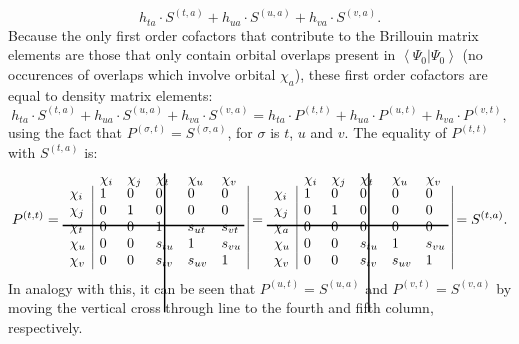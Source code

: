 \begin{equation}
h_{ta} \cdot S^{(t,a)} + h_{ua} \cdot S^{(u,a)} + h_{va} \cdot S^{(v,a)}.
\label{ch2.eq.ta_1el2}
\end{equation}
Because the only first order cofactors that contribute to the Brillouin matrix elements are those that only contain orbital overlaps present in $\left< \Psi_0 | \Psi_0 \right>$ (no occurences of overlaps which involve orbital $\chi_a$), these first order cofactors are equal to density matrix elements:
\begin{equation}
h_{ta} \cdot S^{(t,a)} + h_{ua} \cdot S^{(u,a)} + h_{va} \cdot S^{(v,a)} = h_{ta} \cdot P^{(t,t)} + h_{ua} \cdot P^{(u,t)} + h_{va} \cdot P^{(v,t)},
\label{ch2.eq.ta_i1}
\end{equation}
using the fact that $P^{(\sigma,t)} = S^{(\sigma,a)}$, for $\sigma$ is $t$, $u$ and $v$. The equality of $P^{(t,t)}$ with $S ^{(t,a)}$ is:
\begin{equation}
P^{(t,t)}=
\begin{array}{llllll}
 & \hskip 46.0 pt \hbox{\lower 93pt\hbox{\vrule height100pt width 1.0pt}}\hskip-47.0pt \chi_i & \chi_j & \chi_t & \chi_u & \chi_v \\
 \noalign{\vskip-91pt}
 \chi_i &  \multicolumn{1}{|l}{ 1 } & 0 & 0 & 0 & \multicolumn{1}{l|}{ 0 } \\
 \chi_j & \multicolumn{1}{|l}{ 0 } & 1 & 0 & 0 & \multicolumn{1}{l|}{ 0 } \\
 \chi_t & \multicolumn{1}{|l}{ 0 } & 0 & 1 & s_{ut} & \multicolumn{1}{l|}{s_{vt}} \\
 \noalign{\vskip-8pt}
 \multispan6\hbox{\vrule  height 1.0 pt width130pt}\cr
 \noalign{\vskip 7pt}
 \chi_u & \multicolumn{1}{|l}{ 0 } & 0 & s_{tu} & 1 & \multicolumn{1}{l|}{s_{vu}} \\
 \chi_v & \multicolumn{1}{|l}{ 0 } & 0 & s_{tv} & s_{uv} & \multicolumn{1}{l|}{ 1 }
\end{array} =
\begin{array}{llllll}
 & \hskip 46.0 pt \hbox{\lower 93pt\hbox{\vrule height100pt width 1.0pt}}\hskip-47.0pt \chi_i & \chi_j & \chi_t & \chi_u & \chi_v \\
 \noalign{\vskip-91pt}
 \chi_i &  \multicolumn{1}{|l}{ 1 } & 0 & 0 & 0 & \multicolumn{1}{l|}{ 0 } \\
 \chi_j & \multicolumn{1}{|l}{ 0 } & 1 & 0 & 0 & \multicolumn{1}{l|}{ 0 } \\
 \chi_a & \multicolumn{1}{|l}{ 0 } & 0 & 0 & 0 & \multicolumn{1}{l|}{ 0 } \\
 \noalign{\vskip-8pt}
 \multispan6\hbox{\vrule  height 1.0 pt width130pt}\cr
 \noalign{\vskip 7pt}
 \chi_u & \multicolumn{1}{|l}{ 0 } & 0 & s_{tu} & 1 & \multicolumn{1}{l|}{s_{vu}} \\
 \chi_v & \multicolumn{1}{|l}{ 0 } & 0 & s_{tv} & s_{uv} & \multicolumn{1}{l|}{ 1 }
\end{array}=S^{(t,a)}.
\label{ch2.eq.p_is_s}
\end{equation}
In analogy with this, it can be seen that $P^{(u,t)}=S^{(u,a)}$ and $P^{(v,t)}=S^{(v,a)}$ by moving the vertical cross through line to the fourth and fifth column, respectively. 

